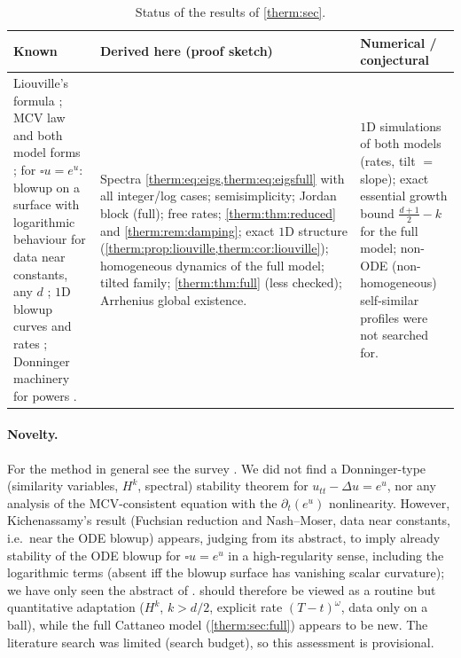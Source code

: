 \begin{table}[t]
\centering
\small
\begin{tabular}{@{}p{}p{}p{}@{}}
\toprule
Known & Derived here (proof sketch) & Numerical / conjectural\\
\midrule
Liouville's formula \cite{Liouville1853}; MCV law and both model forms
\cite{Cattaneo1958,MendezFortFarjas1999}; for $\square u=e^u$: blowup on a
surface with logarithmic behaviour for data near constants, any $d$
\cite{Kichenassamy1996}; $1$D blowup curves and rates
\cite{Godin2000,Godin2001,AzaiezMasmoudiZaag2016}; Donninger machinery for powers
\cite{DonningerSchoerkhuber2012,DonningerSchoerkhuber2014,DonningerSchoerkhuber2017,Ostermann2024}.
&
Spectra \cref{therm:eq:eigs,therm:eq:eigsfull} with all integer/log cases;
semisimplicity; Jordan block (full); free rates; \cref{therm:thm:reduced}
and \cref{therm:rem:damping}; exact $1$D structure
(\cref{therm:prop:liouville,therm:cor:liouville}); homogeneous dynamics of the full
model; tilted family; \cref{therm:thm:full} (less checked); Arrhenius global existence.
&
$1$D simulations of both models (rates, tilt $=$ slope); exact essential
growth bound $\frac{d+1}2-k$ for the full model; non-ODE (non-homogeneous)
self-similar profiles were not searched for.\\
\bottomrule
\end{tabular}
\caption{Status of the results of \cref{therm:sec}.}
\label{therm:tab:status}
\end{table}

\paragraph{Novelty.}  For the method in general see the survey \cite{Donninger2024}.
We did not find a Donninger-type (similarity variables,
$H^k$, spectral) stability theorem for $u_{tt}-\Delta u=e^u$, nor any analysis of the
MCV-consistent equation with the $\partial_t(e^u)$ nonlinearity.  However,
Kichenassamy's result \cite{Kichenassamy1996} (Fuchsian reduction and Nash--Moser,
data near constants, i.e.\ near the ODE blowup) appears, judging from its
abstract, to imply already stability of the
ODE blowup for $\square u=e^u$ in a high-regularity sense, including the
logarithmic terms (absent iff the blowup surface has vanishing scalar
curvature); we have only seen the abstract of \cite{Kichenassamy1996}.
 should therefore be viewed as a routine but
quantitative adaptation ($H^k$, $k>d/2$, explicit rate $(T-t)^\omega$, data only on a
ball), while the full Cattaneo model (\cref{therm:sec:full}) appears to be new.
The literature search was limited (search budget), so this assessment is
provisional.

